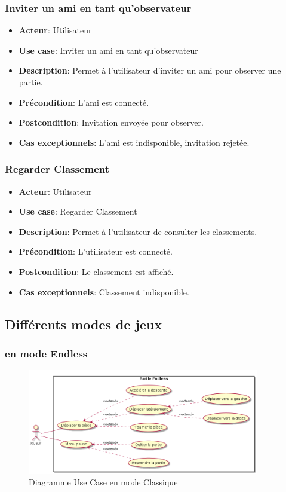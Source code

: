 \documentclass{article}
\begin{document}
\subsubsection*{Inviter un ami en tant qu'observateur}
\begin{itemize}
    \item \textbf{Acteur}: Utilisateur
    \item \textbf{Use case}: Inviter un ami en tant qu'observateur
    \item \textbf{Description}: Permet à l'utilisateur d'inviter un ami pour observer une partie.
    \item \textbf{Précondition}: L'ami est connecté.
    \item \textbf{Postcondition}: Invitation envoyée pour observer.
    \item \textbf{Cas exceptionnels}: L'ami est indisponible, invitation rejetée.
\end{itemize}

\subsubsection*{Regarder Classement}
\begin{itemize}
    \item \textbf{Acteur}: Utilisateur
    \item \textbf{Use case}: Regarder Classement
    \item \textbf{Description}: Permet à l'utilisateur de consulter les classements.
    \item \textbf{Précondition}: L'utilisateur est connecté.
    \item \textbf{Postcondition}: Le classement est affiché.
    \item \textbf{Cas exceptionnels}: Classement indisponible.
\end{itemize}

\subsection{Différents modes de jeux}

\subsubsection*{en mode Endless}

\begin{figure}
    \centering
    \includegraphics[width=0.9\textwidth]{./uml/usescase/en-jeu/endless.png}
    \caption{Diagramme Use Case en mode Classique}
    \label{fig:Classique}
\end{figure}
\end{document}
